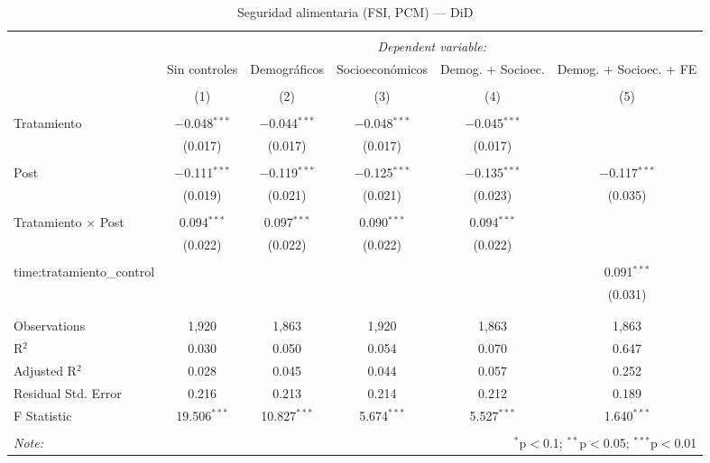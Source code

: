 
\begin{table}[H] \centering 
  \caption{Seguridad alimentaria (FSI, PCM) — DiD} 
  \label{reg_fs_fsi} 
\tiny 
\begin{tabular}{@{\extracolsep{-7pt}}lccccc} 
\\[-1.8ex]\hline 
\hline \\[-1.8ex] 
 & \multicolumn{5}{c}{\textit{Dependent variable:}} \\ 
\cline{2-6} 
 & Sin controles & Demográficos & Socioeconómicos & Demog. + Socioec. & Demog. + Socioec. + FE \\ 
\\[-1.8ex] & (1) & (2) & (3) & (4) & (5)\\ 
\hline \\[-1.8ex] 
 Tratamiento & $-$0.048$^{***}$ & $-$0.044$^{***}$ & $-$0.048$^{***}$ & $-$0.045$^{***}$ &  \\ 
  & (0.017) & (0.017) & (0.017) & (0.017) &  \\ 
  & & & & & \\ 
 Post & $-$0.111$^{***}$ & $-$0.119$^{***}$ & $-$0.125$^{***}$ & $-$0.135$^{***}$ & $-$0.117$^{***}$ \\ 
  & (0.019) & (0.021) & (0.021) & (0.023) & (0.035) \\ 
  & & & & & \\ 
 Tratamiento × Post & 0.094$^{***}$ & 0.097$^{***}$ & 0.090$^{***}$ & 0.094$^{***}$ &  \\ 
  & (0.022) & (0.022) & (0.022) & (0.022) &  \\ 
  & & & & & \\ 
 time:tratamiento\_control &  &  &  &  & 0.091$^{***}$ \\ 
  &  &  &  &  & (0.031) \\ 
  & & & & & \\ 
\hline \\[-1.8ex] 
Observations & 1,920 & 1,863 & 1,920 & 1,863 & 1,863 \\ 
R$^{2}$ & 0.030 & 0.050 & 0.054 & 0.070 & 0.647 \\ 
Adjusted R$^{2}$ & 0.028 & 0.045 & 0.044 & 0.057 & 0.252 \\ 
Residual Std. Error & 0.216 & 0.213 & 0.214 & 0.212 & 0.189 \\ 
F Statistic & 19.506$^{***}$ & 10.827$^{***}$ & 5.674$^{***}$ & 5.527$^{***}$ & 1.640$^{***}$ \\ 
\hline 
\hline \\[-1.8ex] 
\textit{Note:}  & \multicolumn{5}{r}{$^{*}$p$<$0.1; $^{**}$p$<$0.05; $^{***}$p$<$0.01} \\ 
\end{tabular} 
\end{table} 
